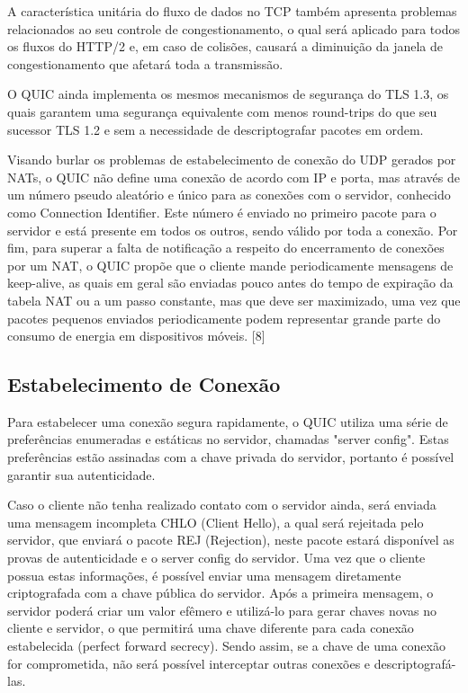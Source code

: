 \documentclass{article}
\begin{document}
A característica unitária do fluxo de dados no TCP também apresenta problemas relacionados ao seu controle de
congestionamento, o qual será aplicado para todos os fluxos do HTTP/2 e, em caso de colisões, causará a diminuição da
janela de congestionamento que afetará toda a transmissão.

O QUIC ainda implementa os mesmos mecanismos de segurança do TLS 1.3, os quais garantem uma segurança equivalente com
menos round-trips do que seu sucessor TLS 1.2 e sem a necessidade de descriptografar pacotes em ordem.

Visando burlar os problemas de estabelecimento de conexão do UDP gerados por NATs, o QUIC não define uma conexão de
acordo com IP e porta, mas através de um número pseudo aleatório e único para as conexões com o servidor, conhecido como
Connection Identifier. Este número é enviado no primeiro pacote para o servidor e está presente em todos os outros,
sendo válido por toda a conexão. Por fim, para superar a falta de notificação a respeito do encerramento de conexões por
um NAT, o QUIC propõe que o cliente mande periodicamente mensagens de keep-alive, as quais em geral são enviadas pouco
antes do tempo de expiração da tabela NAT ou a um passo constante, mas que deve ser maximizado, uma vez que pacotes
pequenos enviados periodicamente podem representar grande parte do consumo de energia em dispositivos móveis. [8]

\subsection{Estabelecimento de Conexão}
Para estabelecer uma conexão segura rapidamente, o QUIC utiliza uma série de preferências enumeradas e estáticas no
servidor, chamadas "server config". Estas preferências estão assinadas com a chave privada do servidor, portanto é
possível garantir sua autenticidade.

Caso o cliente não tenha realizado contato com o servidor ainda, será enviada uma mensagem incompleta CHLO (Client
Hello), a qual será rejeitada pelo servidor, que enviará o pacote REJ (Rejection), neste pacote estará disponível as
provas de autenticidade e o server config do servidor. Uma vez que o cliente possua estas informações, é possível enviar
uma mensagem diretamente criptografada com a chave pública do servidor. Após a primeira mensagem, o servidor poderá
criar um valor efêmero e utilizá-lo para gerar chaves novas no cliente e servidor, o que permitirá uma chave diferente
para cada conexão estabelecida (perfect forward secrecy). Sendo assim, se a chave de uma conexão for comprometida, não
será possível interceptar outras conexões e descriptografá-las.
\end{document}
